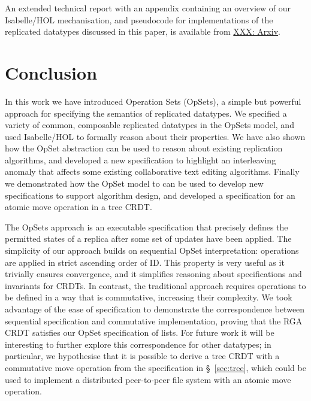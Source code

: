 \documentclass[a4paper,english]{lipics-v2018}
\begin{document}
An extended technical report with an appendix containing an overview of our Isabelle/HOL mechanisation, and pseudocode for implementations of the replicated datatypes discussed in this paper, is available from \url{XXX: Arxiv}.







\section{Conclusion}

In this work we have introduced Operation Sets (OpSets), a simple but powerful approach for specifying the semantics of replicated datatypes.
We specified a variety of common, composable replicated datatypes in the OpSets model, and used Isabelle/HOL to formally reason about their properties.
We have also shown how the OpSet abstraction can be used to reason about existing replication algorithms, and developed a new specification to highlight an interleaving anomaly that affects some existing collaborative text editing algorithms.
Finally we demonstrated how the OpSet model to can be used to develop new specifications to support algorithm design, and developed a specification for an atomic move operation in a tree CRDT.

The OpSets approach is an executable specification that precisely defines the permitted states of a replica after some set of updates have been applied.
The simplicity of our approach builds on sequential OpSet interpretation: operations are applied in strict ascending order of ID.
This property is very useful as it trivially ensures convergence, and it simplifies reasoning about specifications and invariants for CRDTs.
In contrast, the traditional approach requires operations to be defined in a way that is commutative, increasing their complexity.
We took advantage of the ease of specification to demonstrate the correspondence between sequential specification and commutative implementation, proving that the RGA CRDT satisfies our OpSet specification of lists.
For future work it will be interesting to further explore this correspondence for other datatypes; in particular, we hypothesise that it is possible to derive a tree CRDT with a commutative move operation from the specification in \S~\ref{sec:tree}, which could be used to implement a distributed peer-to-peer file system with an atomic move operation.
\end{document}
